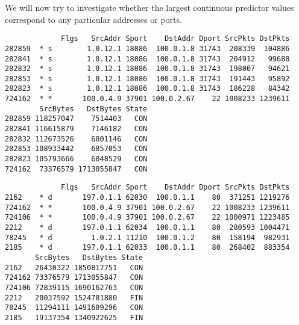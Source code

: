 \documentclass[12pt,twoside]{dukestatscithesis}
\theoremstyle{definition}
\theoremstyle{definition}
\theoremstyle{definition}
\theoremstyle{remark}
\begin{document}
We will now try to investigate whether the largest continuous predictor
values correspond to any particular addresses or ports.
\begin{Shaded}
\begin{Highlighting}[]
\StringTok{ }\NormalTok{argus[}\NormalTok{(-SrcBytes)),][}\NormalTok{:}\NormalTok{,]}
\StringTok{ }\NormalTok{argus[}\NormalTok{(-SrcPkts)),][}\NormalTok{:}\NormalTok{,]}
\StringTok{ }\NormalTok{argus[}\NormalTok{(-DstBytes)),][}\NormalTok{:}\NormalTok{,]}
\StringTok{ }\NormalTok{argus[}\NormalTok{(-DstPkts)),][}\NormalTok{:}\NormalTok{,]}
\end{Highlighting}
\end{Shaded}
\begin{verbatim}
             Flgs   SrcAddr Sport    DstAddr Dport SrcPkts DstPkts
282859  * s        1.0.12.1 18086  100.0.1.8 31743  208339  104886
282841  * s        1.0.12.1 18086  100.0.1.8 31743  204912   99688
282832  * s        1.0.12.1 18086  100.0.1.8 31743  198007   94621
282853  * s        1.0.12.1 18086  100.0.1.8 31743  191443   95892
282823  * s        1.0.12.1 18086  100.0.1.8 31743  186228   84342
724162  * *       100.0.4.9 37901 100.0.2.67    22 1008233 1239611
        SrcBytes   DstBytes State
282859 118257047    7514403   CON
282841 116615879    7146182   CON
282832 112673526    6801146   CON
282853 108933442    6857053   CON
282823 105793666    6048529   CON
724162  73376579 1713055847   CON
\end{verbatim}
\begin{Shaded}
\begin{Highlighting}[]
\end{Highlighting}
\end{Shaded}
\begin{verbatim}
             Flgs   SrcAddr Sport    DstAddr Dport SrcPkts DstPkts
2162    * d       197.0.1.1 62030  100.0.1.1    80  371251 1219276
724162  * *       100.0.4.9 37901 100.0.2.67    22 1008233 1239611
724106  * *       100.0.4.9 37901 100.0.2.67    22 1000971 1223485
2212    * d       197.0.1.1 62034  100.0.1.1    80  280593 1004471
78245   * d         1.0.2.1 11210  100.0.1.2    80  158194  982931
2185    * d       197.0.1.1 62033  100.0.1.1    80  268402  883354
       SrcBytes   DstBytes State
2162   26430322 1850817751   CON
724162 73376579 1713055847   CON
724106 72839115 1690162763   CON
2212   20037592 1524781880   FIN
78245  11294111 1491609296   CON
2185   19137354 1340922625   FIN
\end{verbatim}
\end{document}
